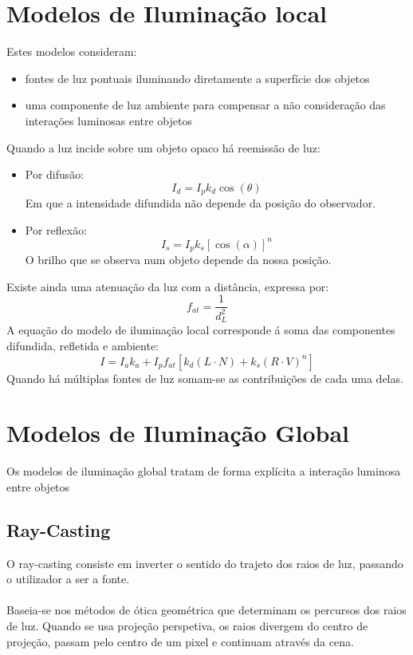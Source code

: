 \documentclass[10pt,a4paper]{report}
\begin{document}
\section{Modelos de Iluminação local}
Estes modelos consideram:
\begin{itemize}
\item fontes de luz pontuais iluminando diretamente a superfície dos objetos
\item uma componente de luz ambiente para compensar a não consideração das interações luminosas entre objetos
\end{itemize}
Quando a luz incide sobre um objeto opaco há reemissão de luz:
\begin{itemize}
\item Por difusão:
$$
I_d = I_pk_d \cos(\theta)
$$
Em que a intensidade difundida não depende da posição do observador.
\item Por reflexão:
$$
I_s = I_p k_s [\cos(\alpha)]^n
$$
O brilho que se observa num objeto depende da nossa posição.
\end{itemize}
Existe ainda uma atenuação da luz com a distância, expressa por:
$$
f_{at} = \frac{1}{d_L^2}
$$
A equação do modelo de iluminação local corresponde á soma das componentes difundida, refletida e ambiente:
$$
I = I_ak_a + I_pf_{at}[k_d(L\cdot N) + k_s (R\cdot V)^n]
$$
Quando há múltiplas fontes de luz somam-se as contribuições de cada uma delas.
\section{Modelos de Iluminação Global}
Os modelos de iluminação global tratam de forma explícita a interação luminosa entre objetos
\subsection{Ray-Casting}
O ray-casting consiste em inverter o sentido do trajeto dos raios de luz, passando o utilizador a ser a fonte.\\
\\
Baseia-se nos métodos de ótica geométrica que determinam os percursos dos raios de luz. Quando se usa projeção perspetiva, os raios divergem do centro de projeção, passam pelo centro de um pixel e continuam através da cena.
\end{document}
